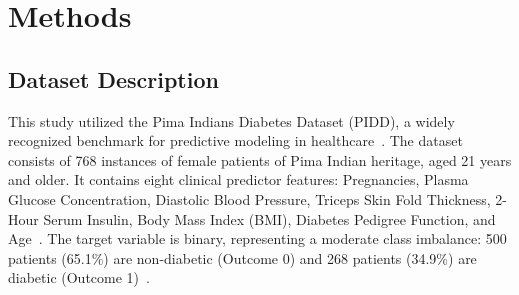 \documentclass[3p,twocolumn]{elsarticle}
\begin{document}
\begin{table}
\centering
\caption{Comparison of the proposed methodology with representative high-accuracy systems on the PIDD.}
\label{tab:comparison}
\end{table}


\section{Methods}

\subsection{Dataset Description}

This study utilized the Pima Indians Diabetes Dataset (PIDD), a widely recognized benchmark for predictive modeling in healthcare~\cite{KagglePIDD}. The dataset consists of 768 instances of female patients of Pima Indian heritage, aged 21 years and older. It contains eight clinical predictor features: Pregnancies, Plasma Glucose Concentration, Diastolic Blood Pressure, Triceps Skin Fold Thickness, 2-Hour Serum Insulin, Body Mass Index (BMI), Diabetes Pedigree Function, and Age~\cite{Kapoor2024Leakage}. The target variable is binary, representing a moderate class imbalance: 500 patients (65.1\%) are non-diabetic (Outcome 0) and 268 patients (34.9\%) are diabetic (Outcome 1)~\cite{Kapoor2024Leakage}.
\end{document}

